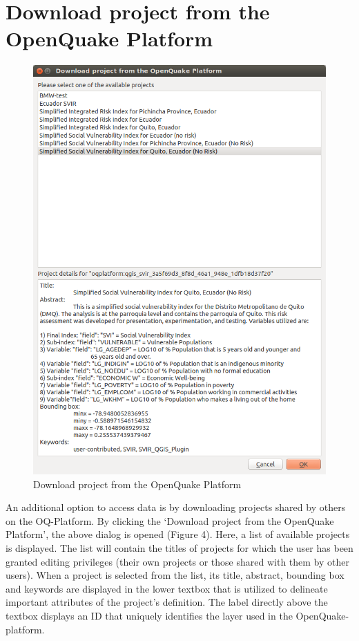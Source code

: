 \section{Download project from the OpenQuake Platform}

\begin{figure}
    \centering
    \includegraphics[width=\textwidth]{../images/image15}
    \caption{Download project from the OpenQuake Platform}
    \label{fig:download_project_from_platform}
\end{figure}

An additional option to access data is by downloading projects shared by others
on the OQ-Platform. By clicking the `Download project from the OpenQuake
Platform', the above dialog is opened (Figure 4). Here, a list of available
projects is displayed. The list will contain the titles of projects for which
the user has been granted editing privileges (their own projects or those
shared with them by other users). When a project is selected from the list, its
title, abstract, bounding box and keywords are displayed in the lower textbox
that is utilized to delineate important attributes of the project’s definition.
The label directly above the textbox displays an ID that uniquely identifies
the layer used in the OpenQuake-platform.

